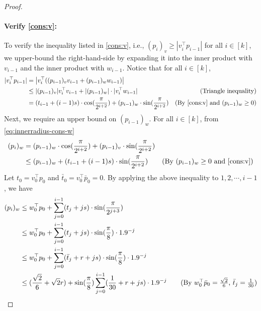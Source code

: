 \documentclass{article}\usepackage[a4paper,margin=20mm]{geometry}
\begin{document}
\begin{proof}
    \paragraph{Verify \eqref{cons:v}:}
    To verify the inequality listed in \eqref{cons:v}, i.e.,
    $(p_i)_v \geq |v_i^\top p_{i-1}|$ for all $i \in [k]$, we upper-bound the right-hand-side by expanding it into the inner product with $v_{i-1}$ and the inner product with $w_{i-1}$.
    Notice that for all $i \in [k]$,
    \begin{align}\label{eq:innerradius-cond-v}
        |v_i^\top p_{i-1}| &= \left|v_i^\top ((p_{i-1})_v v_{i-1} + (p_{i-1})_w w_{i-1}) \right| \nonumber \\
        &\leq |(p_{i-1})_v| v_i^\top v_{i-1} + |(p_{i-1})_w| \cdot |v_i^\top w_{i-1}| & \text{(Triangle inequality)} \nonumber \\
        &= (t_{i-1} + (i-1)s) \cdot \cos(\frac{\pi}{2^{i + 2}}) + (p_{i-1})_w \cdot \sin(\frac{\pi}{2^{i+2}}) & \text{(By \eqref{cons:v} and $(p_{i-1})_w \geq 0$)} 
    \end{align}
    Next, we require an upper bound on $(p_{i-1})_w$. For all $i\in [k]$, from \eqref{eq:innerradius-cons-w}
    \begin{align*}
        (p_i)_w &= (p_{i-1})_w \cdot \cos(\frac{\pi}{2^{i+2}}) + (p_{i-1})_v \cdot \sin(\frac{\pi}{2^{i+2}}) \\
        &\leq (p_{i-1})_w + (t_{i-1} + (i-1)s) \cdot \sin(\frac{\pi}{2^{i+2}}) \tag{By $(p_{i-1})_w \geq 0$ and \eqref{cons:v}} 
    \end{align*}
    Let $t_0 = v_0^\top p_0$ and $\bar{t}_0 = v_0^\top \bar{p}_0 = 0$.
    By applying the above inequality to $1, 2, \cdots, i-1$,
    we have
    \begin{align}
        (p_{i})_w &\leq w_0^\top p_0 + \sum_{j=0}^{i-1} (t_j + js) \cdot \sin(\frac{\pi}{2^{j+3}}) \nonumber \\
        &\leq w_0^\top p_0 + \sum_{j=0}^{i-1} (t_j + js) \cdot \sin(\frac{\pi}{8}) \cdot 1.9^{-j}  \nonumber \\
        &\leq w_0^\top p_0 + \sum_{j=0}^{i-1} (\bar{t}_j + r + js) \cdot \sin(\frac{\pi}{8}) \cdot 1.9^{-j} \nonumber \\
        &\leq (\frac{\sqrt{2}}{6} + \sqrt{2} r) + \sin(\frac{\pi}{8}) \sum_{j=0}^{i-1}  (\frac{1}{30} + r + js) \cdot 1.9^{-j} \tag{By $w_0^\top \bar{p}_0 = \frac{\sqrt{2}}{6}$, $\bar{t}_j = \frac{1}{30}$} \nonumber \\

\end{align}
\end{proof}
\end{document}
